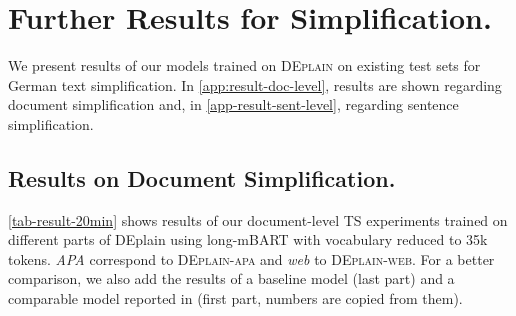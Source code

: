 \documentclass[11pt]{article}
\begin{document}
\begin{table}[htb]
\caption{Overview of train/dev/test split.}
\label{table-data-split}
\end{table}

\section{Further Results for Simplification.}
\label{appendix-tables-results-sentence-level}
We present results of our models trained on \textsc{DEplain} on existing test sets for German text simplification. In \autoref{app:result-doc-level}, results are shown regarding document simplification and, in \autoref{app-result-sent-level}, regarding sentence simplification.

\subsection{Results on Document Simplification.}
\label{app:result-doc-level}
\autoref{tab-result-20min} shows results of our document-level TS experiments trained on different parts of DEplain using long-mBART with vocabulary reduced to 35k tokens. \emph{APA} correspond to \textsc{DEplain-apa} and \emph{web} to \textsc{DEplain-web}. For a better comparison, we also add the results of a baseline model (last part) and a comparable model reported in \citet{rios-etal-2021-new} (first part, numbers are copied from them).
\end{document}

